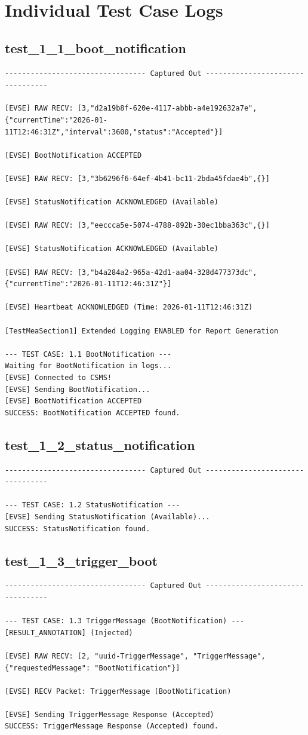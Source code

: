 \documentclass{article}
\begin{document}
\section{Individual Test Case Logs}\subsection*{test\_1\_1\_boot\_notification}
\begin{lstlisting}
--------------------------------- Captured Out ---------------------------------

[EVSE] RAW RECV: [3,"d2a19b8f-620e-4117-abbb-a4e192632a7e",{"currentTime":"2026-01-11T12:46:31Z","interval":3600,"status":"Accepted"}]

[EVSE] BootNotification ACCEPTED

[EVSE] RAW RECV: [3,"3b6296f6-64ef-4b41-bc11-2bda45fdae4b",{}]

[EVSE] StatusNotification ACKNOWLEDGED (Available)

[EVSE] RAW RECV: [3,"eeccca5e-5074-4788-892b-30ec1bba363c",{}]

[EVSE] StatusNotification ACKNOWLEDGED (Available)

[EVSE] RAW RECV: [3,"b4a284a2-965a-42d1-aa04-328d477373dc",{"currentTime":"2026-01-11T12:46:31Z"}]

[EVSE] Heartbeat ACKNOWLEDGED (Time: 2026-01-11T12:46:31Z)

[TestMeaSection1] Extended Logging ENABLED for Report Generation

--- TEST CASE: 1.1 BootNotification ---
Waiting for BootNotification in logs...
[EVSE] Connected to CSMS!
[EVSE] Sending BootNotification...
[EVSE] BootNotification ACCEPTED
SUCCESS: BootNotification ACCEPTED found.
\end{lstlisting}
\subsection*{test\_1\_2\_status\_notification}
\begin{lstlisting}
--------------------------------- Captured Out ---------------------------------

--- TEST CASE: 1.2 StatusNotification ---
[EVSE] Sending StatusNotification (Available)...
SUCCESS: StatusNotification found.
\end{lstlisting}
\subsection*{test\_1\_3\_trigger\_boot}
\begin{lstlisting}
--------------------------------- Captured Out ---------------------------------

--- TEST CASE: 1.3 TriggerMessage (BootNotification) ---
[RESULT_ANNOTATION] (Injected)

[EVSE] RAW RECV: [2, "uuid-TriggerMessage", "TriggerMessage", {"requestedMessage": "BootNotification"}]

[EVSE] RECV Packet: TriggerMessage (BootNotification)

[EVSE] Sending TriggerMessage Response (Accepted)
SUCCESS: TriggerMessage Response (Accepted) found.
\end{lstlisting}
\end{document}
